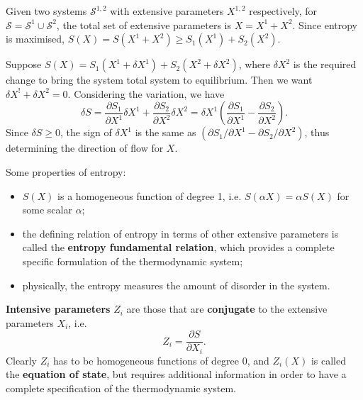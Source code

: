 \documentclass[letter-paper]{tufte-book}
\newenvironment{example}[1][Example]{\begin{trivlist}
\item[\hskip \labelsep {\bfseries #1}]}{\end{trivlist}}
\newcommand\Def[1]{\textbf{#1}}
\begin{document}
\begin{example}
Given two systems $\mathcal{S}^{1,2}$ with extensive parameters $X^{1,2}$
respectively, for $\mathcal{S} = \mathcal{S}^1 \cup \mathcal{S}^2$, the total
set of extensive parameters is $X = X^1 + X^2$. Since entropy is maximised,
$S(X) = S(X^1 + X^2) \geq S_1(X^1) + S_2(X^2)$.

Suppose $S(X) = S_1(X^1 + \delta X^1) + S_2(X^2 + \delta X^2)$, where $\delta
X^2$ is the required change to bring the system total system to equilibrium.
Then we want $\delta X^! + \delta X^2 = 0$. Considering the variation, we have
\begin{equation*}
  \delta S = \frac{\partial S_1}{\partial X^1} \delta X^1 + \frac{\partial S_2}{\partial X^2} \delta X^2 = \delta X^1 \left(\frac{\partial S_1}{\partial X^1} - \frac{\partial S_2}{\partial X^2}\right).
\end{equation*}
Since $\delta S \geq 0$, the sign of $\delta X^1$ is the same as $(\partial S_1
/ \partial X^1 - \partial S_2 / \partial X^2)$, thus determining the direction
of flow for $X$.
\end{example}

Some properties of entropy:
\begin{itemize}
  \item $S(X)$ is a homogeneous function of degree 1, i.e. $S(\alpha X) =
  \alpha S(X)$ for some scalar $\alpha$;
  \item the defining relation of entropy in terms of other extensive parameters
  is called the \Def{entropy fundamental relation}, which provides a complete
  specific formulation of the thermodynamic system;
  \item physically, the entropy measures the amount of disorder in the system.
\end{itemize}

\Def{Intensive parameters} $Z_i$ are those that are \Def{conjugate} to the
extensive parameters $X_i$, i.e.
\begin{equation}
  Z_i = \frac{\partial S}{\partial X_i}.
\end{equation}
Clearly $Z_i$ has to be homogeneous functions of degree 0, and $Z_i(X)$ is
called the \Def{equation of state}, but requires additional information in order
to have a complete specification of the thermodynamic system.
\end{document}
